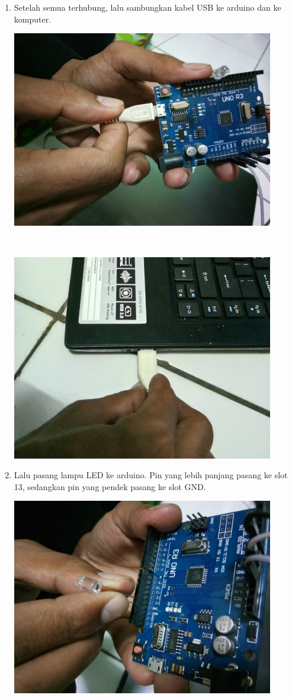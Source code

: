 \begin{enumerate}
\item Setelah semua terhubung, lalu sambungkan kabel USB ke arduino dan ke komputer.
\break\\
\centerline{\includegraphics[width=0.9\textwidth]{figures/ss8.jpeg}}
\break\\
\centerline{\includegraphics[width=0.9\textwidth]{figures/ss7.jpeg}}
\item Lalu pasang lampu LED ke arduino. Pin yang lebih panjang pasang ke slot 13, sedangkan pin yang pendek pasang ke slot GND.
\break\\
\centerline{\includegraphics[width=0.9\textwidth]{figures/ss9.jpeg}}

\end{enumerate}
